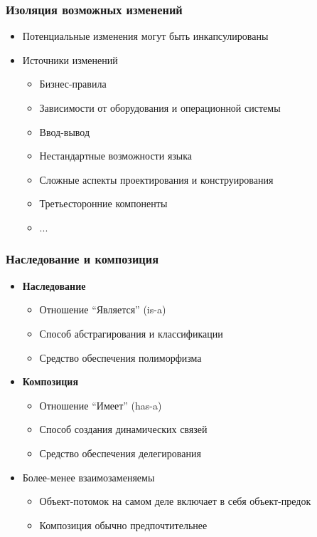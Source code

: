 \documentclass{../../slides-style}
\begin{document}
    \begin{frame}
        \frametitle{Изоляция возможных изменений}
        \begin{itemize}
            \item Потенциальные изменения могут быть инкапсулированы
            \item Источники изменений
            \begin{itemize}
                \item Бизнес-правила
                \item Зависимости от оборудования и операционной системы
                \item Ввод-вывод
                \item Нестандартные возможности языка
                \item Сложные аспекты проектирования и конструирования
                \item Третьесторонние компоненты
                \item ...
            \end{itemize}
        \end{itemize}
    \end{frame}

    \begin{frame}
        \frametitle{Наследование и композиция}
        \begin{itemize}
            \item \textbf{Наследование}
            \begin{itemize}
                \item Отношение ``Является'' (is-a)
                \item Способ абстрагирования и классификации
                \item Средство обеспечения полиморфизма
            \end{itemize}
            \item \textbf{Композиция}
            \begin{itemize}
                \item Отношение ``Имеет'' (has-a)
                \item Способ создания динамических связей
                \item Средство обеспечения делегирования
            \end{itemize}
            \item Более-менее взаимозаменяемы
            \begin{itemize}
                \item Объект-потомок на самом деле включает в себя объект-предок
                \item Композиция обычно предпочтительнее
            \end{itemize}
        \end{itemize}
    \end{frame}
\end{document}
